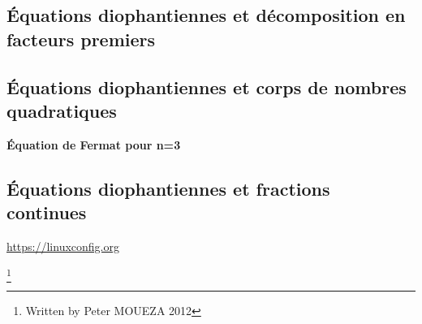 \documentclass{article}
\begin{document}

  
\subsection{Équations diophantiennes et décomposition en facteurs premiers}

\subsection{Équations diophantiennes et corps de nombres quadratiques}
\textbf{Équation de Fermat pour n=3}


\subsection{Équations diophantiennes et fractions continues}





\url{https://linuxconfig.org}

\footnote{Written by Peter MOUEZA 2012}
\end{document}
